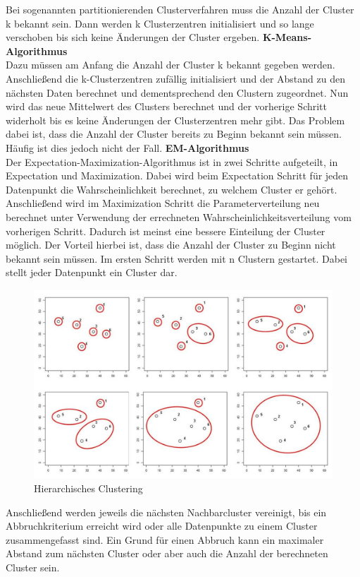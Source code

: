 Bei sogenannten partitionierenden Clusterverfahren muss die Anzahl der Cluster k bekannt sein. Dann werden k Clusterzentren initialisiert und so lange verschoben bis sich keine Änderungen der Cluster ergeben. 
\newline
\textbf{K-Means-Algorithmus}\\
Dazu müssen am Anfang die Anzahl der Cluster k bekannt gegeben werden. Anschließend die k-Clusterzentren zufällig initialisiert und der Abstand zu den nächsten Daten berechnet und dementsprechend den Clustern zugeordnet. Nun wird das neue Mittelwert des Clusters berechnet und der vorherige Schritt widerholt bis es keine Änderungen der Clusterzentren mehr gibt. Das Problem dabei ist, dass die Anzahl der Cluster bereits zu Beginn bekannt sein müssen. Häufig ist dies jedoch nicht der Fall.
\newline
\textbf{EM-Algorithmus}\\
Der Expectation-Maximization-Algorithmus ist in zwei Schritte aufgeteilt, in Expectation und Maximization. Dabei wird beim Expectation Schritt für jeden Datenpunkt die Wahrscheinlichkeit berechnet, zu welchem Cluster er gehört. Anschließend wird im Maximization Schritt die Parameterverteilung neu berechnet unter Verwendung der errechneten Wahrscheinlichkeitsverteilung vom vorherigen Schritt. Dadurch ist meinst eine bessere Einteilung der Cluster möglich.
Der Vorteil hierbei ist, dass die Anzahl der Cluster zu Beginn nicht bekannt sein müssen. Im ersten Schritt werden mit n Clustern gestartet. Dabei stellt jeder Datenpunkt ein Cluster dar.
 \begin{figure}[h]
	\includegraphics[width=1\linewidth]{Bilder/hierarchisches_clustering}
	\caption{Hierarchisches Clustering}\label{hierarchisches_clustering}
\end{figure}  
 Anschließend werden jeweils die nächsten Nachbarcluster vereinigt, bis ein Abbruchkriterium erreicht wird oder alle Datenpunkte zu einem Cluster zusammengefasst sind. Ein Grund für einen Abbruch kann ein maximaler Abstand zum nächsten Cluster oder aber auch die Anzahl der berechneten Cluster sein.


